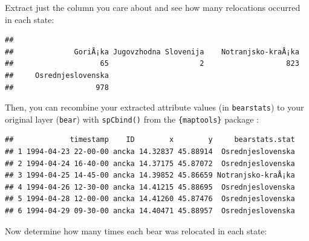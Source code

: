 \documentclass[]{book}
\newenvironment{Shaded}{\begin{snugshade}}{\end{snugshade}}
\newcommand{\DataTypeTok}[1]{\textcolor[rgb]{0.13,0.29,0.53}{#1}}
\newcommand{\DecValTok}[1]{\textcolor[rgb]{0.00,0.00,0.81}{#1}}
\newcommand{\KeywordTok}[1]{\textcolor[rgb]{0.13,0.29,0.53}{\textbf{#1}}}
\newcommand{\NormalTok}[1]{#1}
\newcommand{\OperatorTok}[1]{\textcolor[rgb]{0.81,0.36,0.00}{\textbf{#1}}}
\newcommand{\StringTok}[1]{\textcolor[rgb]{0.31,0.60,0.02}{#1}}
\begin{document}
Extract just the column you care about and see how many relocations occurred in each state:

\begin{Shaded}
\end{Shaded}

\begin{verbatim}
## 
##              GoriÅ¡ka Jugovzhodna Slovenija    Notranjsko-kraÅ¡ka 
##                    65                     2                   823 
##     Osrednjeslovenska 
##                   978
\end{verbatim}

Then, you can recombine your extracted attribute values (in \texttt{bearstats}) to your original layer (\texttt{bear}) with \texttt{spCbind()} from the \texttt{\{maptools\}} package \citep{R-maptools}:

\begin{Shaded}
\end{Shaded}

\begin{verbatim}
##             timestamp    ID        x        y     bearstats.stat
## 1 1994-04-23 22-00-00 ancka 14.32837 45.88914  Osrednjeslovenska
## 2 1994-04-24 16-40-00 ancka 14.37175 45.87072  Osrednjeslovenska
## 3 1994-04-25 14-45-00 ancka 14.39852 45.86659 Notranjsko-kraÅ¡ka
## 4 1994-04-26 12-30-00 ancka 14.41215 45.88695  Osrednjeslovenska
## 5 1994-04-28 12-00-00 ancka 14.41260 45.87476  Osrednjeslovenska
## 6 1994-04-29 09-30-00 ancka 14.40471 45.88957  Osrednjeslovenska
\end{verbatim}

Now determine how many times each bear was relocated in each state:

\begin{Shaded}
\end{Shaded}
\end{document}
